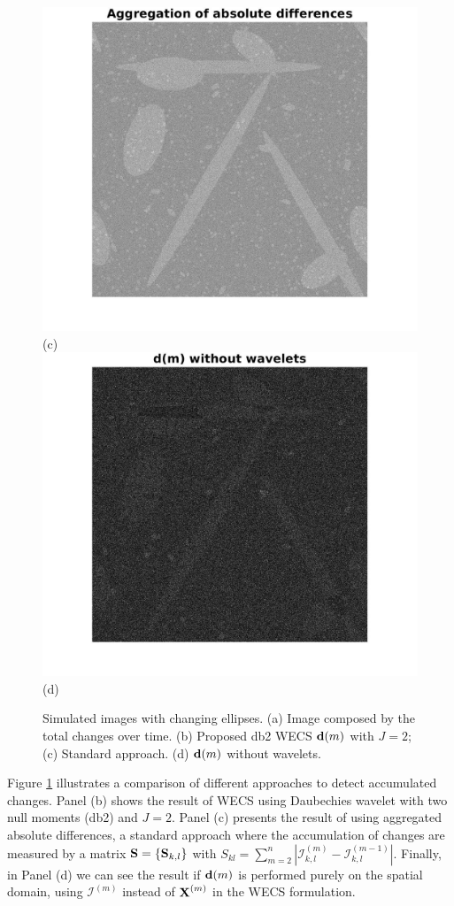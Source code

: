 \documentclass[journal]{IEEEtran}
\newcommand{\vd}{{\textbf d}}
\newcommand{\vS}{{\textbf S}}
\newcommand{\vX}{{\textbf X}}
\begin{document}
\begin{figure}[htp!]
\includegraphics[scale=.1]{../../figs/corr_changes_logratios}(c)
\includegraphics[scale=.1]{../../figs/corr_changes_dm_nowavelets}(d)
\caption{Simulated images with changing ellipses. (a) Image composed by the total changes over time. (b) Proposed db2 WECS $\vd(m)$ with $J=2$; (c) Standard approach. (d) $\vd(m)$ without wavelets.}
\label{F:Changes_methods_images}
\end{figure}

Figure \ref{F:Changes_methods_images} illustrates a comparison of different approaches to detect accumulated changes. Panel (b) shows the result of WECS using Daubechies wavelet with two null moments (db2) and $J=2$. Panel (c) presents the result of using aggregated absolute differences, a standard approach where the accumulation of changes are measured by a matrix $\vS=\{\vS_{k,l}\}$ with $S_{kl} = \sum_{m=2}^n	|\mathcal{I}_{k,l}^{(m)} - \mathcal{I}_{k,l}^{(m-1)}|$. Finally, in Panel (d) we can see the result if $\vd(m)$ is performed purely on the spatial domain, using $\mathcal{I}^{(m)}$ instead of $\vX^{(m)}$ in the WECS formulation. 
\end{document}

